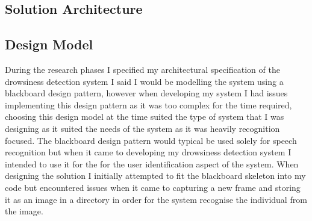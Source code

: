 \subsection{Solution Architecture}
\subsection{Design Model}
During the research phases I specified my architectural specification of the drowsiness detection system I said I would be modelling the system using a blackboard design pattern, however when developing my system I had issues  implementing this design pattern as it was too complex for the time required, choosing this design model  at the time suited the type of system that I was designing  as it suited the needs of the system as it was heavily recognition focused. The blackboard design pattern would typical be used solely for speech recognition but when it came to developing my drowsiness detection system I intended to use it for the for the user identification aspect of the system.  When designing the solution I initially attempted to fit the  blackboard skeleton into my code but encountered issues when it came to capturing a new frame and storing it as an image in a directory in order for the system recognise the individual from the image. 

